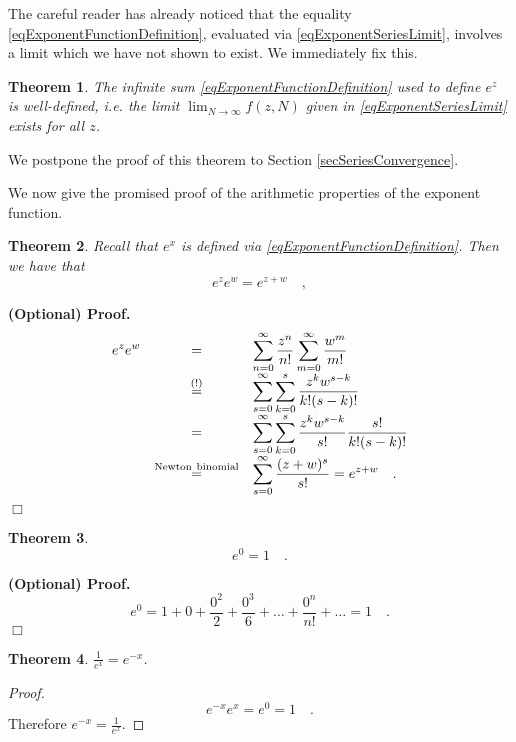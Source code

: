 \documentclass[12pt]{book}
\newcommand{\eqAttention}{\stackrel{(!)}{=}}
\newenvironment{proofOptional}[1][]{ \noindent \textbf{(Optional) Proof#1.}}{$\Box$\medskip}
\newtheorem{theorem}{Theorem}[section]
\begin{document}
The careful reader has already noticed that the equality \eqref{eqExponentFunctionDefinition}, evaluated via \eqref{eqExponentSeriesLimit}, involves a limit which we have not shown to exist. We immediately fix this.
\begin{theorem} The infinite sum \eqref{eqExponentFunctionDefinition} used to define $e^z$ is well-defined, i.e. the limit $\displaystyle\lim_{N\to \infty} f(z, N)$ given in \eqref{eqExponentSeriesLimit} exists for all $z$.
\end{theorem}
We postpone the proof of this theorem to Section \ref{secSeriesConvergence}.

We now give the promised proof of the arithmetic properties of the exponent function.
\begin{theorem}\label{thExponentArgumentsAddWhenMultiplying}
Recall that $e^x$ is defined via \eqref{eqExponentFunctionDefinition}. Then we have that \begin{equation}\boxed{
e^{z} e^{w}=e^{z+w}\quad ,
}
\end{equation}
\end{theorem}
\begin{proofOptional}
\[
\begin{array}{rcl}
\displaystyle
\displaystyle e^{z} e^w&=&\displaystyle  \sum_{n=0}^{\infty} \frac{z^n}{n!} \sum_{m=0}^{\infty} \frac{w^m}{m!} \\ &\eqAttention&  \displaystyle  \sum_{s=0}^{\infty}\sum_{k=0 }^s \frac{z^{k}w^{s-k}}{k! (s-k)!} \\ &=& \displaystyle  \sum_{s=0}^{\infty}\sum_{k=0 }^s   \frac{z^{k}w^{s-k}}{s!} \frac{s!}{k! (s-k)!}\\ &\stackrel{\mathrm{Newton~binomial}}{=}& \displaystyle  \sum_{s=0}^{\infty} \frac{(z+w)^s}{s!}=e^{z+w}\quad .
\end{array}
\]
\end{proofOptional}
\begin{theorem}
\[
e^0=1\quad .
\]
\end{theorem}
\begin{proofOptional}
\[ e^0 = 1+ 0+ \frac{0^2}{2}+ \frac{0^3}{6}+\dots +\frac{0^n}{n!}+\dots = 1\quad .
\]
\end{proofOptional}

\begin{theorem}
$\frac{1}{e^{x}}= e^{-x}$\quad .
\end{theorem}
\begin{proof}
\[e^{-x}e^x=e^0 = 1\quad .
\]
Therefore $e^{-x}=\frac{1}{e^x}.$
\end{proof}
\end{document}
